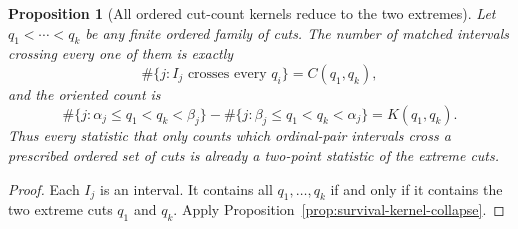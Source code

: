 \documentclass[11pt]{amsart}
\numberwithin{equation}{section}
\theoremstyle{plain}
\newtheorem{proposition}[theorem]{Proposition}
\theoremstyle{definition}
\theoremstyle{remark}
\begin{document}
\begin{proposition}[All ordered cut-count kernels reduce to the two extremes]
\label{prop:multicut-convexity-collapse}
Let $q_1<\cdots<q_k$ be any finite ordered family of cuts.  The number of
matched intervals crossing every one of them is exactly
\begin{equation}
\label{eq:multicut-unsigned-collapse}
\#\{j:\text{$I_j$ crosses every $q_i$}\}=C(q_1,q_k),
\end{equation}
and the oriented count is
\begin{equation}
\label{eq:multicut-signed-collapse}
\#\{j:\alpha_j\le q_1<q_k<\beta_j\}
-\#\{j:\beta_j\le q_1<q_k<\alpha_j\}=K(q_1,q_k).
\end{equation}
Thus every statistic that only counts which ordinal-pair intervals cross a
prescribed ordered set of cuts is already a two-point statistic of the extreme
cuts.
\end{proposition}

\begin{proof}
Each $I_j$ is an interval.  It contains all $q_1,\ldots,q_k$ if and only if it
contains the two extreme cuts $q_1$ and $q_k$.  Apply
Proposition~\ref{prop:survival-kernel-collapse}.
\end{proof}
\end{document}
